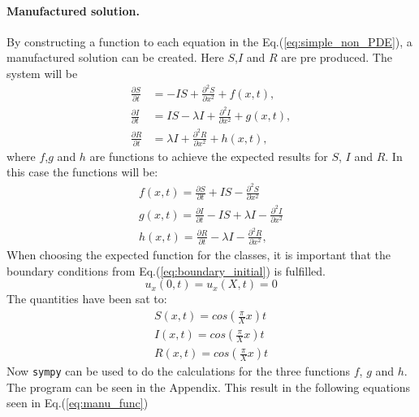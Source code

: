 \documentclass[%
twoside,                 %
final,                   %
10pt]{article}
\begin{document}
\paragraph{Manufactured solution.}
By constructing a function to each equation in the Eq.(\ref{eq:simple_non_PDE}), a manufactured solution can be created. Here $S$,$I$ and $R$ are pre produced. The system will be
\begin{equation} \label{eq:simple_non_PDE2}
	\begin{aligned}
	\frac{\partial S}{\partial t} &= -IS + \frac{\partial^2 S}{\partial x^2}+f(x,t),\\
	\frac{\partial I}{\partial t} &= IS- \lambda I + \frac{\partial^2 I}{\partial x^2}+g(x,t),\\
	\frac{\partial R}{\partial t} &= \lambda I + \frac{\partial^2 R}{\partial x^2}+h(x,t),
	\end{aligned}
\end{equation}
where $f$,$g$ and $h$ are functions to achieve the expected results for $S$, $I$ and $R$. In this case the functions will be:
\begin{equation}
	\begin{aligned}
	f(x,t) = \frac{\partial S}{\partial t} + IS - \frac{\partial^2 S}{\partial x^2}\\
	g(x,t) = \frac{\partial I}{\partial t} - IS + \lambda I - \frac{\partial^2 I}{\partial x^2}\\
	h(x,t) = \frac{\partial R}{\partial t} -\lambda I - \frac{\partial^2 R}{\partial x^2},
	\end{aligned}
\end{equation}
When choosing the expected function for the classes, it is important that the boundary conditions from Eq.(\ref{eq:boundary_initial}) is fulfilled.
\begin{equation}
    u_x(0,t) = u_x(X,t) = 0
\end{equation}
The quantities have been sat to:
\begin{equation}
	\begin{aligned}
    S(x,t) = cos(\frac{\pi}{X}x)t\\
    I(x,t) = cos(\frac{\pi}{X}x)t\\
    R(x,t) = cos(\frac{\pi}{X}x)t
	\end{aligned}
\end{equation}
Now \Verb!sympy! can be used to do the calculations for the three functions $f$, $g$ and $h$. The program can be seen in the Appendix. This result in the following equations seen in Eq.(\ref{eq:manu_func}) 
\end{document}
